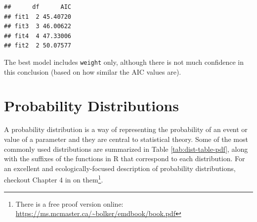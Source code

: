 \documentclass[]{book}
\newenvironment{Shaded}{\begin{snugshade}}{\end{snugshade}}
\newcommand{\KeywordTok}[1]{\textcolor[rgb]{0.13,0.29,0.53}{\textbf{#1}}}
\newcommand{\NormalTok}[1]{#1}
\newcommand{\OperatorTok}[1]{\textcolor[rgb]{0.81,0.36,0.00}{\textbf{#1}}}
\newcommand{\StringTok}[1]{\textcolor[rgb]{0.31,0.60,0.02}{#1}}
\let\rmarkdownfootnote\footnote%
\def\footnote{\protect\rmarkdownfootnote}
\begin{document}
\begin{Shaded}
\end{Shaded}

\begin{verbatim}
##      df      AIC
## fit1  2 45.40720
## fit3  3 46.00622
## fit4  4 47.33006
## fit2  2 50.07577
\end{verbatim}

The best model includes \texttt{weight} only, although there is not much confidence in this conclusion (based on how similar the AIC values are).

\hypertarget{dists}{%
\section{Probability Distributions}\label{dists}}

A probability distribution is a way of representing the probability of an event or value of a parameter and they are central to statistical theory. Some of the most commonly used distributions are summarized in Table \ref{tab:dist-table-pdf}, along with the suffixes of the functions in R that correspond to each distribution. For an excellent and ecologically-focused description of probability distributions, checkout Chapter 4 in \citet{emdbook-cite} on them\footnote{There is a free proof version online: \url{https://ms.mcmaster.ca/~bolker/emdbook/book.pdf}}.
\end{document}
